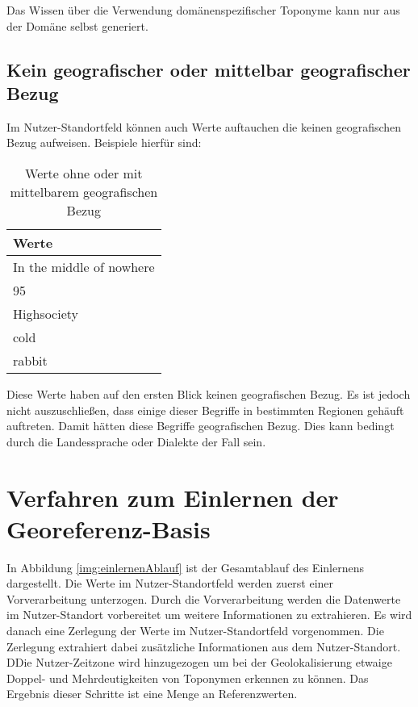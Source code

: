 			Das Wissen über die Verwendung domänenspezifischer Toponyme kann nur aus der Domäne selbst generiert.
		
		\subsection{Kein geografischer oder mittelbar geografischer Bezug} \label{sub:keinGeogOdMittelBarereBezug}

			Im Nutzer-Standortfeld können auch Werte auftauchen die keinen geografischen Bezug aufweisen.
			Beispiele hierfür sind:

			\begin{table}[h]
			\centering
			\caption{Werte ohne oder mit mittelbarem geografischen Bezug}
			\label{tab:keinOderMittelbarBezug}
			\begin{tabular}{|l|}
			Werte                      	\\ \hline
			In the middle of nowhere   	\\ \hline
			95                         	\\ \hline
			Highsociety                	\\ \hline
			cold	                 	\\ \hline
			rabbit     					\\ \hline
			\end{tabular}
			\end{table}

			Diese Werte haben auf den ersten Blick keinen geografischen Bezug.
			Es ist jedoch nicht auszuschließen, dass einige dieser Begriffe in bestimmten Regionen gehäuft auftreten.
			Damit hätten diese Begriffe geografischen Bezug.
			Dies kann bedingt durch die Landessprache oder Dialekte der Fall sein.

	\section{Verfahren zum Einlernen der Georeferenz-Basis} \label{sec:VefrahrenZumEinlernen} 	
			
			In Abbildung \ref{img:einlernenAblauf} ist der Gesamtablauf des Einlernens dargestellt. 
			Die Werte im Nutzer-Standortfeld werden zuerst einer Vorverarbeitung unterzogen. 
			Durch die Vorverarbeitung werden die Datenwerte im Nutzer-Standort vorbereitet um weitere Informationen zu extrahieren.
			Es wird danach eine Zerlegung der Werte im Nutzer-Standortfeld vorgenommen.
			Die Zerlegung extrahiert dabei zusätzliche Informationen aus dem Nutzer-Standort.
			DDie Nutzer-Zeitzone wird hinzugezogen um bei der Geolokalisierung etwaige Doppel- und Mehrdeutigkeiten von Toponymen erkennen zu können.
			Das Ergebnis dieser Schritte ist eine Menge an Referenzwerten.

